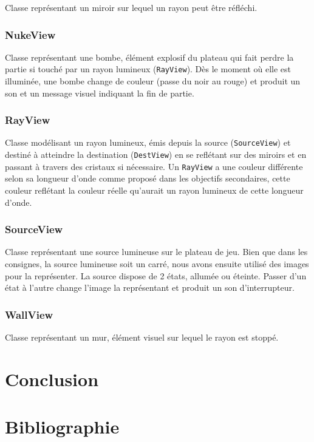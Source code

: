 \documentclass[]{article}
\begin{document}
Classe représentant un miroir sur lequel un rayon peut être réfléchi.

\subsubsection{NukeView}

Classe représentant une bombe, élément explosif du plateau qui fait perdre la partie
si touché par un rayon lumineux (\texttt{RayView}). Dès le moment où elle est illuminée, une bombe
change de couleur (passe du noir au rouge) et produit un son et un message visuel indiquant la fin de partie.

\subsubsection{RayView}

Classe modélisant un rayon lumineux, émis depuis la source (\texttt{SourceView}) et destiné à atteindre la destination 
(\texttt{DestView}) en se reflétant sur des miroirs et en passant à travers des cristaux si nécessaire.
Un \texttt{RayView} a une couleur différente selon sa longueur d’onde comme proposé dans les objectifs secondaires,
cette couleur reflétant la couleur réelle qu’aurait un rayon lumineux de cette longueur d’onde.

\subsubsection{SourceView}

Classe représentant une source lumineuse sur le plateau de jeu. Bien que dans les consignes, la source lumineuse soit un carré, nous avons ensuite utilisé des images pour la représenter.
La source dispose de 2 états, allumée ou éteinte. Passer d’un état à l’autre change l’image la représentant et produit un son d’interrupteur.

\subsubsection{WallView}

Classe représentant un mur, élément visuel sur lequel le rayon est stoppé.

\section{Conclusion}

\section{Bibliographie}
\end{document}
